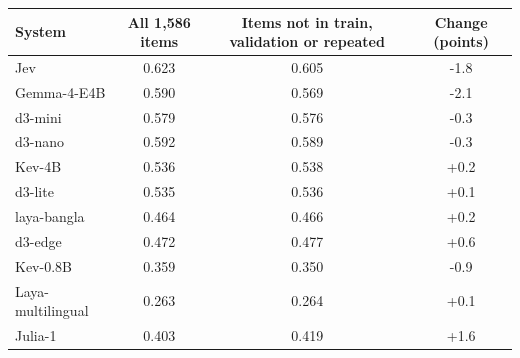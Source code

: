 \begin{tabular}{@{}lccc@{}}\toprule
System & All 1,586 items & Items not in train, validation or repeated & Change (points) \\\midrule
Jev & 0.623 & 0.605 & -1.8 \\
Gemma-4-E4B & 0.590 & 0.569 & -2.1 \\
d3-mini & 0.579 & 0.576 & -0.3 \\
d3-nano & 0.592 & 0.589 & -0.3 \\
Kev-4B & 0.536 & 0.538 & +0.2 \\
d3-lite & 0.535 & 0.536 & +0.1 \\
laya-bangla & 0.464 & 0.466 & +0.2 \\
d3-edge & 0.472 & 0.477 & +0.6 \\
Kev-0.8B & 0.359 & 0.350 & -0.9 \\
Laya-multilingual & 0.263 & 0.264 & +0.1 \\
Julia-1 & 0.403 & 0.419 & +1.6 \\
\bottomrule\end{tabular}
